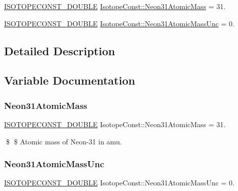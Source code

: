 \begin{DoxyCompactItemize}
\item 
\mbox{\hyperlink{group___isotope_const-_macros_ga8f45a7272ce02c0b4c65c44636ed719a}{I\+S\+O\+T\+O\+P\+E\+C\+O\+N\+S\+T\+\_\+\+D\+O\+U\+B\+LE}} \mbox{\hyperlink{group___isotope_const-_neon-_ne31_gae2055d4f905a173b06da1f7851f755a1}{Isotope\+Const\+::\+Neon31\+Atomic\+Mass}} = 31.
\item 
\mbox{\hyperlink{group___isotope_const-_macros_ga8f45a7272ce02c0b4c65c44636ed719a}{I\+S\+O\+T\+O\+P\+E\+C\+O\+N\+S\+T\+\_\+\+D\+O\+U\+B\+LE}} \mbox{\hyperlink{group___isotope_const-_neon-_ne31_gaccb8d257e689aa2c0a10b903af899985}{Isotope\+Const\+::\+Neon31\+Atomic\+Mass\+Unc}} = 0.
\end{DoxyCompactItemize}


\subsection{Detailed Description}


\subsection{Variable Documentation}
\mbox{\label{group___isotope_const-_neon-_ne31_gae2055d4f905a173b06da1f7851f755a1}} 
\subsubsection{\texorpdfstring{Neon31\+Atomic\+Mass}{Neon31AtomicMass}}
{\footnotesize\ttfamily \mbox{\hyperlink{group___isotope_const-_macros_ga8f45a7272ce02c0b4c65c44636ed719a}{I\+S\+O\+T\+O\+P\+E\+C\+O\+N\+S\+T\+\_\+\+D\+O\+U\+B\+LE}} Isotope\+Const\+::\+Neon31\+Atomic\+Mass = 31.}

\$ \$ Atomic mass of Neon-\/31 in amu. \mbox{\label{group___isotope_const-_neon-_ne31_gaccb8d257e689aa2c0a10b903af899985}} 
\subsubsection{\texorpdfstring{Neon31\+Atomic\+Mass\+Unc}{Neon31AtomicMassUnc}}
{\footnotesize\ttfamily \mbox{\hyperlink{group___isotope_const-_macros_ga8f45a7272ce02c0b4c65c44636ed719a}{I\+S\+O\+T\+O\+P\+E\+C\+O\+N\+S\+T\+\_\+\+D\+O\+U\+B\+LE}} Isotope\+Const\+::\+Neon31\+Atomic\+Mass\+Unc = 0.}

